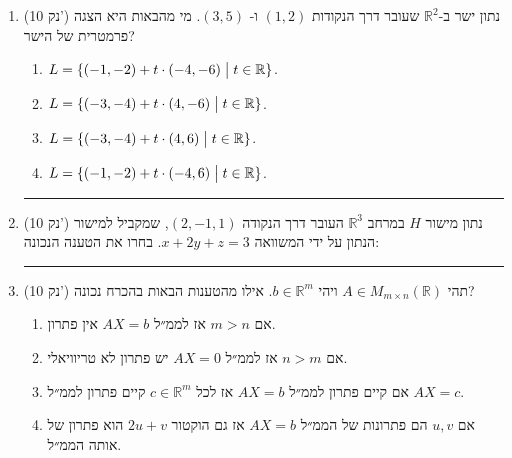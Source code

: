 \documentclass[12pt, a4paper]{article}
\newcommand{\rr}{\mathbb{R}}
\newcommand{\points}[1]{(#1 נק') }
\begin{document}
\begin{enumerate}





\item\points{10}
נתון ישר ב-$\rr^2$
שעובר דרך הנקודות
$(1,2)$
ו-
$(3,5)$.
מי מהבאות היא הצגה פרמטרית של הישר?
\begin{enumerate}
\item
$L=\{ (-1,-2)+t\cdot (-4,-6)\bigm|
t\in\rr\}$.
\item
$L=\{ (-3,-4)+t\cdot (4,-6)\bigm|
t\in\rr\}$.
\item
$L=\{ (-3,-4)+t\cdot (4,6)\bigm|
t\in\rr\}$.
\item
$L=\{ (-1,-2)+t\cdot (-4,6)\bigm|
t\in\rr\}$.
\end{enumerate}

\noindent\rule{\textwidth-30pt}{0.4pt}

\item\points{10}
נתון מישור
$H$
במרחב
$\rr^3$
העובר דרך הנקודה
$(2,-1,1)$,
שמקביל למישור הנתון על ידי המשוואה
$x+2y+z=3$.
בחרו את הטענה הנכונה:
\begin{enumerate}
\end{enumerate}

\noindent\rule{\textwidth-30pt}{0.4pt}


\item\points{10}
תהי
$A\in M_{m\times n}(\rr)$
ויהי
$b\in \rr^m$.
אילו מהטענות הבאות בהכרח נכונה?
\begin{enumerate}
\item
אם
$m>n$
אז לממ״ל
$AX=b$
אין פתרון.
\item
אם
$n>m$
אז לממ״ל
$AX=0$
יש פתרון לא טריוויאלי.
\item
אם קיים פתרון לממ״ל
$AX=b$
אז לכל
$c\in \rr^m$
קיים פתרון לממ״ל
$AX=c$.
\item
אם
$u,v$
הם פתרונות של הממ״ל
$AX=b$
אז גם הוקטור
$2u+v$
הוא פתרון של אותה הממ״ל.
\end{enumerate}


\end{enumerate}
\end{document}
